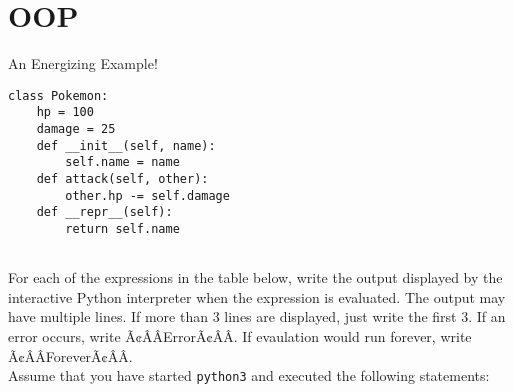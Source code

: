 \documentclass{exam}
\begin{document}
\section{OOP}
\begin{questions}
\item An Energizing Example!
\begin{lstlisting}
class Pokemon:
    hp = 100
    damage = 25
    def __init__(self, name):
        self.name = name
    def attack(self, other):
        other.hp -= self.damage
    def __repr__(self):
        return self.name
 
\end{lstlisting}
For each of the expressions in the table below, write the output displayed by the interactive Python interpreter when the expression is evaluated. The output may have multiple lines. If more than 3 lines are displayed, just write the first 3. If an error occurs, write Ã¢ÂÂErrorÃ¢ÂÂ. If evaulation would run forever, write Ã¢ÂÂForeverÃ¢ÂÂ.\\
Assume that you have started \texttt{python3} and executed the following statements:


\end{questions}
\end{document}
